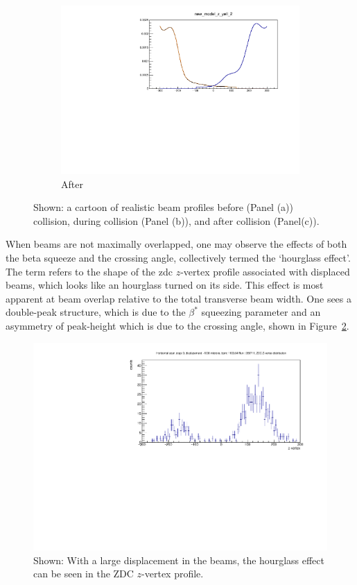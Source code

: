 \begin{figure}[ht]
\begin{subfigure}{0.7\linewidth}
    \includegraphics[width=\textwidth]{./figures/359711_time_step_2_bunch_collision.pdf}
    \caption{After}
  \end{subfigure}
  \caption{
    Shown: a cartoon of realistic beam profiles before (Panel (a)) collision,
    during collision (Panel (b)), and after collision (Panel(c)).
  }
  \label{fig:beam_profile_overlap}
\end{figure}

When beams are not maximally overlapped, one may observe the effects of both the
beta squeeze and the crossing angle, collectively termed the `hourglass effect'.
The term refers to the shape of the zdc $z$-vertex profile associated with
displaced beams, which looks like an hourglass turned on its side. This effect
is most apparent at beam overlap relative to the total transverse beam width.
One sees a double-peak structure, which is due to the $\beta^*$ squeezing
parameter and an asymmetry of peak-height which is due to the crossing angle,
shown in Figure~\ref{fig:zdc_beam_displacement}. 

\begin{figure}[h]
  \centering
  \includegraphics[width=0.8\linewidth]{./figures/zdc_zvertex_max_displacement_359711.pdf}
  \caption{
    Shown: With a large displacement in the beams, the hourglass effect can be
    seen in the ZDC $z$-vertex profile.
  }
  \label{fig:zdc_beam_displacement}
\end{figure}


